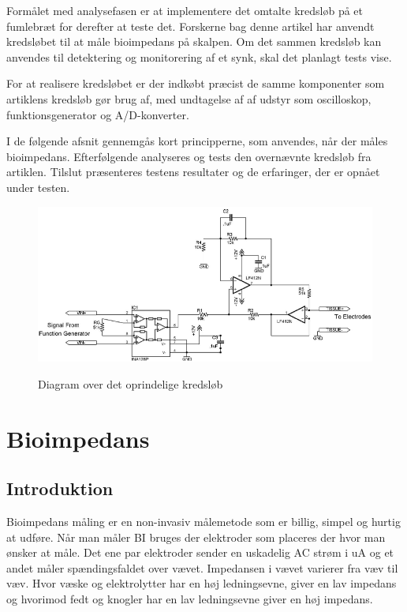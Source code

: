 Formålet med analysefasen er at implementere det omtalte kredsløb på et fumlebræt for derefter at teste det. Forskerne bag denne artikel har anvendt kredsløbet til at måle bioimpedans på skalpen. Om det sammen kredsløb kan anvendes til detektering og monitorering af et synk, skal det planlagt tests vise. 

For at realisere kredsløbet er der indkøbt præcist de samme komponenter  som artiklens kredsløb gør brug af, med undtagelse af af udstyr som oscilloskop, funktionsgenerator og A/D-konverter.

I de følgende afsnit gennemgås kort principperne, som anvendes, når der måles bioimpedans.  Efterfølgende analyseres og tests den overnævnte kredsløb fra artiklen. Tilslut præsenteres testens resultater og de erfaringer, der er opnået under testen. 



\begin{figure}[H]
\centering
{\includegraphics[width=12cm]
{Figure/BIdiagram}}
\caption{Diagram over det oprindelige kredsløb\cite{Aroom2009}}
\label{fig:BIdiagram}
\end{figure}


\chapter{Bioimpedans}
\section{Introduktion}
Bioimpedans måling  er en non-invasiv målemetode som er billig, simpel og hurtig at udføre. Når man måler BI bruges der elektroder som placeres der hvor man ønsker at måle. Det ene par elektroder sender en uskadelig AC strøm i uA og et andet måler spændingsfaldet over vævet. Impedansen i vævet varierer fra væv til væv. Hvor væske og elektrolytter har en høj ledningsevne, giver en lav impedans og hvorimod fedt og knogler har en lav ledningsevne giver en høj impedans.\cite{Brantlov2017} 

